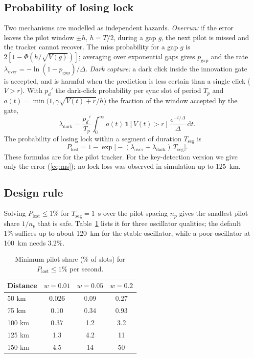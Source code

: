 \documentclass[journal]{IEEEtran}
\theoremstyle{plain}
\begin{document}
\subsection{Probability of losing lock}
Two mechanisms are modelled as independent hazards. \emph{Overrun:} if the error leaves the pilot window $\pm h$, $h=T/2$, during a gap $g$, the next pilot is missed and the tracker cannot recover. The miss probability for a gap $g$ is $2[1-\Phi(h/\sqrt{V(g)})]$; averaging over exponential gaps gives $p_{\mathrm{gap}}$ and the rate $\lambda_{\mathrm{over}}=-\ln(1-p_{\mathrm{gap}})/\Delta$. \emph{Dark capture:} a dark click inside the innovation gate is accepted, and is harmful when the prediction is less certain than a single click ($V>r$). With $p_d'$ the dark-click probability per sync slot of period $T_p$ and $a(t)=\min\!\big(1,\gamma\sqrt{V(t)+r}/h\big)$ the fraction of the window accepted by the gate,
\begin{equation}
\lambda_{\mathrm{dark}}=\frac{p_d'}{T_p}\int_0^\infty a(t)\,\mathbf 1[V(t)>r]\,\frac{e^{-t/\Delta}}{\Delta}\,\mathrm dt.
\end{equation}
The probability of losing lock within a segment of duration $T_{\mathrm{seg}}$ is
\begin{equation}
P_{\mathrm{lost}}=1-\exp\!\big[-(\lambda_{\mathrm{over}}+\lambda_{\mathrm{dark}})\,T_{\mathrm{seg}}\big].
\label{eq:lost}
\end{equation}
These formulas are for the pilot tracker. For the key-detection version we give only the error (\ref{eq:ms}); no lock loss was observed in simulation up to 125~km.

\subsection{Design rule}
Solving $P_{\mathrm{lost}}\le1\%$ for $T_{\mathrm{seg}}=1$~s over the pilot spacing $n_p$ gives the smallest pilot share $1/n_p$ that is safe. Table~\ref{tab:design} lists it for three oscillator qualities; the default 1\% suffices up to about 120~km for the stable oscillator, while a poor oscillator at 100~km needs 3.2\%.

\begin{table}[t]
\caption{Minimum pilot share (\% of slots) for $P_{\mathrm{lost}}\le1\%$ per second.}
\label{tab:design}
\centering
\small
\begin{tabular}{@{}lccc@{}}
\toprule
Distance & $w=0.01$ & $w=0.05$ & $w=0.2$ \\
\midrule
50 km & 0.026 & 0.09 & 0.27 \\
75 km & 0.10 & 0.34 & 0.93 \\
100 km & 0.37 & 1.2 & 3.2 \\
125 km & 1.3 & 4.2 & 11 \\
150 km & 4.5 & 14 & 50 \\
\bottomrule
\end{tabular}
\end{table}
\end{document}
